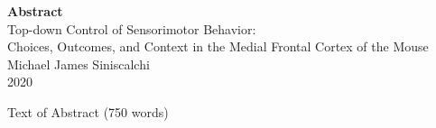 
\begin{center}

\textbf{Abstract}\\

\bigskip
Top-down Control of Sensorimotor Behavior:\\ 
Choices, Outcomes, and Context in the Medial Frontal Cortex of the Mouse\\

\bigskip
Michael James Siniscalchi\\
2020

\end{center}

\doublespacing
Text of Abstract (750 words)
\singlespacing